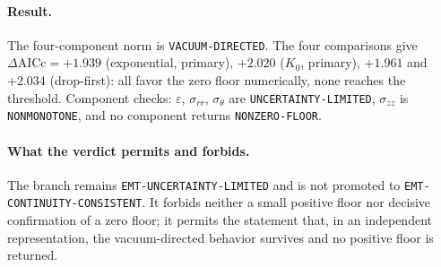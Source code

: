 \documentclass[11pt,a4paper]{article}
\theoremstyle{definition}
\theoremstyle{remark}
\begin{document}
\paragraph{Result.} The four-component norm is \texttt{VACUUM-\allowbreak{}DIRECTED}. The four comparisons give $\Delta\mathrm{AICc}=+1.939$ (exponential, primary), $+2.020$ ($K_0$, primary), $+1.961$ and $+2.034$ (drop-first): all favor the zero floor numerically, none reaches the threshold. Component checks: $\varepsilon$, $\sigma_{rr}$, $\sigma_\theta$ are \texttt{UNCERTAINTY-\allowbreak{}LIMITED}, $\sigma_{zz}$ is \texttt{NONMONOTONE}, and no component returns \texttt{NONZERO-\allowbreak{}FLOOR}.
\paragraph{What the verdict permits and forbids.} The branch remains \texttt{EMT-\allowbreak{}UNCERTAINTY-\allowbreak{}LIMITED} and is not promoted to \texttt{EMT-\allowbreak{}CONTINUITY-\allowbreak{}CONSISTENT}. It forbids neither a small positive floor nor decisive confirmation of a zero floor; it permits the statement that, in an independent representation, the vacuum-directed behavior survives and no positive floor is returned.
\end{document}
